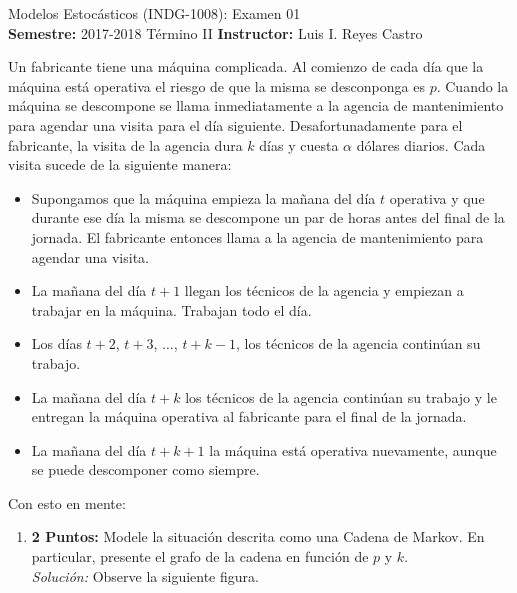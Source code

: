 \documentclass[ a4paper, twoside, 11pt]{article}
\newcommand{\numero}{01}
\begin{document}
\allowdisplaybreaks



\begin{center}
\Large Modelos Estoc\'asticos (INDG-1008): Examen \numero \\[2ex]
\small \textbf{Semestre:} 2017-2018 T\'ermino II \qquad
\textbf{Instructor:} Luis I. Reyes Castro
\end{center}
\fullskip

\begin{problem}
\label{prob:maquina-caprichosa}
Un fabricante tiene una m\'aquina complicada. Al comienzo de cada d\'ia que la m\'aquina est\'a operativa el riesgo de que la misma se desconponga es $p$. Cuando la m\'aquina se descompone se llama inmediatamente a la agencia de mantenimiento para agendar una visita para el d\'ia siguiente. Desafortunadamente para el fabricante, la visita de la agencia dura \linebreak $k$ d\'ias y cuesta $\alpha$ d\'olares diarios. Cada visita sucede de la siguiente manera: 
\begin{itemize}
\item Supongamos que la m\'aquina empieza la ma\~nana del d\'ia $t$ operativa y que durante ese d\'ia la misma se descompone un par de horas antes del final de la jornada. El fabricante entonces llama a la agencia de mantenimiento para agendar una visita. 
\item La ma\~nana del d\'ia $t+1$ llegan los t\'ecnicos de la agencia y empiezan a trabajar en la m\'aquina. Trabajan todo el d\'ia. 
\item Los d\'ias $t+2$, $t+3$, $\dots$, $t+k-1$, los t\'ecnicos de la agencia contin\'uan su trabajo. 
\item La ma\~nana del d\'ia $t+k$ los t\'ecnicos de la agencia contin\'uan su trabajo y le entregan la m\'aquina operativa al fabricante para el final de la jornada. 
\item La ma\~nana del d\'ia $t+k+1$ la m\'aquina est\'a operativa nuevamente, aunque se puede descomponer como siempre. 
\end{itemize}

Con esto en mente: 
\begin{enumerate}[label=\textbf{\alph*)}]
\item \textbf{2 Puntos:} Modele la situaci\'on descrita como una Cadena de Markov. En particular, presente el grafo de la cadena en funci\'on de $p$ y $k$. \\[1ex] \emph{Soluci\'on:} Observe la siguiente figura. 


\end{enumerate}
\end{problem}
\end{document}
